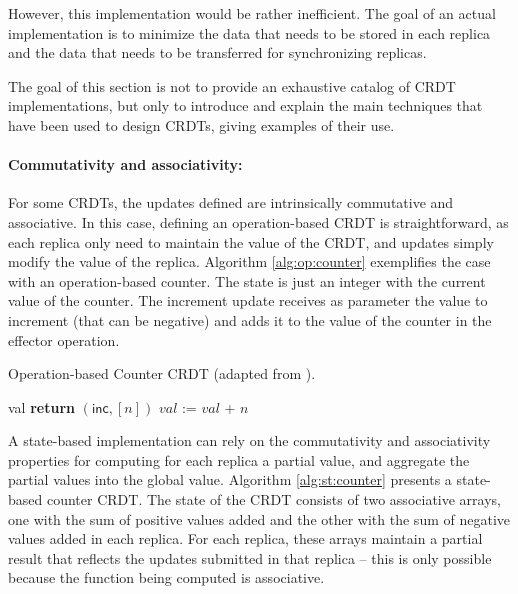 \documentclass[12pt]{article}
\begin{document}
However, this implementation would be rather inefficient. 
The goal of an actual implementation is to minimize the data that needs 
to be stored in each replica and the data that needs to be transferred for
synchronizing replicas.

The goal of this section is not to provide an exhaustive catalog of CRDT 
implementations, but only to introduce and explain the main techniques that 
have been used to design CRDTs, giving examples of their use.

\paragraph{Commutativity and associativity:}
For some CRDTs, the updates defined are intrinsically commutative and associative.
In this case, defining an operation-based CRDT is straightforward, as each replica
only need to maintain the value of the CRDT, and updates simply modify the value of the replica.
Algorithm \ref{alg:op:counter} exemplifies the case with an operation-based counter.
The state is just an integer with the current value of the counter. 
The increment update receives as parameter the value to increment (that can be negative)
and adds it to the value of the counter in the effector operation.

\begin{algorithm}
\caption{Operation-based Counter CRDT (adapted from \cite{Shapiro11Comprehensive}).}
\label{alg:op:counter}
\begin{algorithmic}[1]
\EndPayload
{}
\State \Return val
\EndQuery
{}
\State \textbf{return} $(\mathsf{inc}, [n])$ 
\EndAtSource
{}
\State $\mathit{val}$ := $\mathit{val}$ + $n$
\EndDownstream
\EndUpdateOp
\end{algorithmic}
\end{algorithm}

A state-based implementation can rely on the commutativity and associativity properties
for computing for each replica a partial value, and aggregate the partial
values into the global value. 
Algorithm \ref{alg:st:counter} presents a state-based counter CRDT.
The state of the CRDT consists of two associative arrays, 
one with the sum of positive values added and the other with the sum of
negative values added in each replica. 
For each replica, these arrays maintain a partial result that reflects the 
updates submitted in that replica -- this is only possible because the function being
computed is associative.
\end{document}
